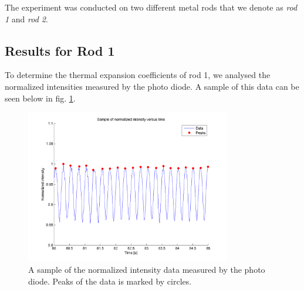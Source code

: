 

The experiment was conducted on two different metal rods that we denote as \emph{rod 1} and \emph{rod 2}.

\subsection{Results for Rod 1}
To determine the thermal expansion coefficients of rod 1, we analysed the normalized intensities measured by the photo diode. A sample of this data can be seen below in fig. \ref{fig:results:1}.

\begin{figure}[htb]
	\centering
	\includegraphics[width=0.8\textwidth]{img/Peaks_alu.png}
	\caption{A sample of the normalized intensity data measured by the photo diode. Peaks of the data is marked by circles.}
	\label{fig:results:1}
\end{figure}

